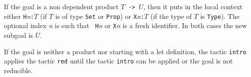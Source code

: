 If the goal is a non dependent product {\tt $T$ -> $U$}, then it puts
in the local context either {\tt H}{\it n}{\tt :$T$} (if $T$ is of
type {\tt Set} or {\tt Prop}) or {\tt X}{\it n}{\tt :$T$} (if the type
of $T$ is {\tt Type}). The optional index {\it n} is such that {\tt
H}{\it n} or {\tt X}{\it n} is a fresh identifier.
In both cases the new subgoal is $U$.

If the goal is neither a product nor starting with a let definition,
the tactic {\tt intro} applies the tactic {\tt red} until the tactic
{\tt intro} can be applied or the goal is not reducible.

\begin{ErrMsgs}
\item {}
\item {}
\end{ErrMsgs}

